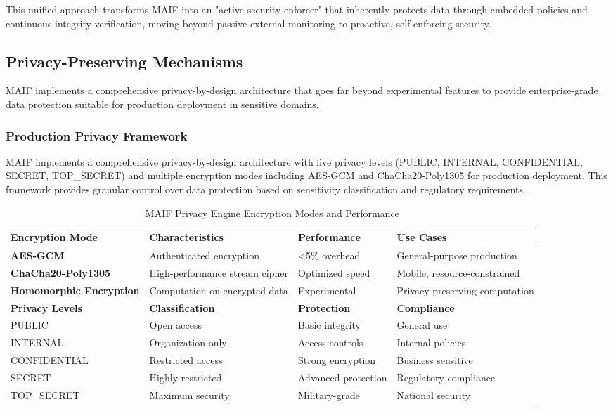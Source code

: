 \documentclass[conference]{IEEEtran}
\begin{document}
This unified approach transforms MAIF into an "active security enforcer" that inherently protects data through embedded policies and continuous integrity verification, moving beyond passive external monitoring to proactive, self-enforcing security.

\subsection{Privacy-Preserving Mechanisms}

MAIF implements a comprehensive privacy-by-design architecture that goes far beyond experimental features to provide enterprise-grade data protection suitable for production deployment in sensitive domains.

\subsubsection{Production Privacy Framework}

MAIF implements a comprehensive privacy-by-design architecture with five privacy levels (PUBLIC, INTERNAL, CONFIDENTIAL, SECRET, TOP\_SECRET) and multiple encryption modes including AES-GCM and ChaCha20-Poly1305 for production deployment. This framework provides granular control over data protection based on sensitivity classification and regulatory requirements.

\begin{table*}[!t]
\renewcommand{\arraystretch}{1.3}
\caption{MAIF Privacy Engine Encryption Modes and Performance}
\label{tab:encryption-modes}
\centering
\footnotesize
\begin{tabular}{p{3.5cm}p{4cm}p{3cm}p{3.5cm}}
\toprule
\textbf{Encryption Mode} & \textbf{Characteristics} & \textbf{Performance} & \textbf{Use Cases} \\
\midrule
\textbf{AES-GCM} & Authenticated encryption & <5\% overhead & General-purpose production \\
\textbf{ChaCha20-Poly1305} & High-performance stream cipher & Optimized speed & Mobile, resource-constrained \\
\textbf{Homomorphic Encryption} & Computation on encrypted data & Experimental & Privacy-preserving computation \\
\midrule
\textbf{Privacy Levels} & \textbf{Classification} & \textbf{Protection} & \textbf{Compliance} \\
\midrule
PUBLIC & Open access & Basic integrity & General use \\
INTERNAL & Organization-only & Access controls & Internal policies \\
CONFIDENTIAL & Restricted access & Strong encryption & Business sensitive \\
SECRET & Highly restricted & Advanced protection & Regulatory compliance \\
TOP\_SECRET & Maximum security & Military-grade & National security \\
\bottomrule
\end{tabular}
\end{table*}
\end{document}
